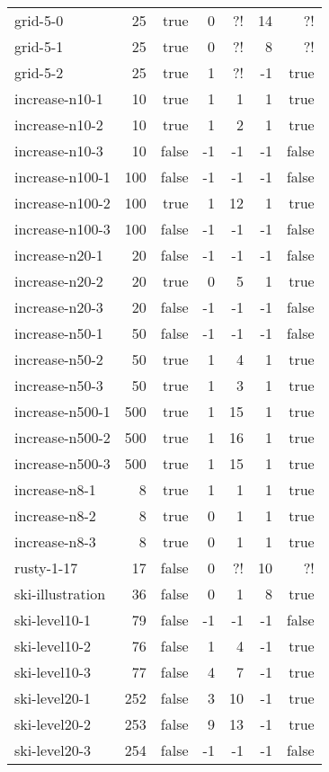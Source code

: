 \documentclass{tufte-handout}
\begin{document}
\begin{longtable}{lrrrrrr}
	grid-5-0 & 25 & true & 0 & ?! & 14 & ?!\\
	grid-5-1 & 25 & true & 0 & ?! & 8 & ?!\\
	grid-5-2 & 25 & true & 1 & ?! & -1 & true\\
	increase-n10-1 & 10 & true & 1 & 1 & 1 & true\\
	increase-n10-2 & 10 & true & 1 & 2 & 1 & true\\
	increase-n10-3 & 10 & false & -1 & -1 & -1 & false\\
	increase-n100-1 & 100 & false & -1 & -1 & -1 & false\\
	increase-n100-2 & 100 & true & 1 & 12 & 1 & true\\
	increase-n100-3 & 100 & false & -1 & -1 & -1 & false\\
	increase-n20-1 & 20 & false & -1 & -1 & -1 & false\\
	increase-n20-2 & 20 & true & 0 & 5 & 1 & true\\
	increase-n20-3 & 20 & false & -1 & -1 & -1 & false\\
	increase-n50-1 & 50 & false & -1 & -1 & -1 & false\\
	increase-n50-2 & 50 & true & 1 & 4 & 1 & true\\
	increase-n50-3 & 50 & true & 1 & 3 & 1 & true\\
	increase-n500-1 & 500 & true & 1 & 15 & 1 & true\\
	increase-n500-2 & 500 & true & 1 & 16 & 1 & true\\
	increase-n500-3 & 500 & true & 1 & 15 & 1 & true\\
	increase-n8-1 & 8 & true & 1 & 1 & 1 & true\\
	increase-n8-2 & 8 & true & 0 & 1 & 1 & true\\
	increase-n8-3 & 8 & true & 0 & 1 & 1 & true\\
	rusty-1-17 & 17 & false & 0 & ?! & 10 & ?!\\
	ski-illustration & 36 & false & 0 & 1 & 8 & true\\
	ski-level10-1 & 79 & false & -1 & -1 & -1 & false\\
	ski-level10-2 & 76 & false & 1 & 4 & -1 & true\\
	ski-level10-3 & 77 & false & 4 & 7 & -1 & true\\
	ski-level20-1 & 252 & false & 3 & 10 & -1 & true\\
	ski-level20-2 & 253 & false & 9 & 13 & -1 & true\\
	ski-level20-3 & 254 & false & -1 & -1 & -1 & false\\

\end{longtable}
\end{document}
